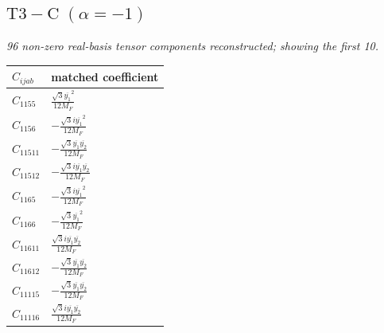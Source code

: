 \documentclass[9pt]{article}
\begin{document}
\subsection*{$ \mathrm{T3-C}\;(\alpha=-1) $}
\textit{96 non-zero real-basis tensor components reconstructed; showing the first 10.}
\begin{longtable}{@{}ll@{}}
\toprule
$C_{ijab}$ & matched coefficient \\
\midrule
$C_{1155}$ & $ \frac{\sqrt{3} \overline{y_{1}}^{2}}{12 M_F} $ \\
$C_{1156}$ & $ - \frac{\sqrt{3} i \overline{y_{1}}^{2}}{12 M_F} $ \\
$C_{11511}$ & $ - \frac{\sqrt{3} \overline{y_{1}} \overline{y_{2}}}{12 M_F} $ \\
$C_{11512}$ & $ - \frac{\sqrt{3} i \overline{y_{1}} \overline{y_{2}}}{12 M_F} $ \\
$C_{1165}$ & $ - \frac{\sqrt{3} i \overline{y_{1}}^{2}}{12 M_F} $ \\
$C_{1166}$ & $ - \frac{\sqrt{3} \overline{y_{1}}^{2}}{12 M_F} $ \\
$C_{11611}$ & $ \frac{\sqrt{3} i \overline{y_{1}} \overline{y_{2}}}{12 M_F} $ \\
$C_{11612}$ & $ - \frac{\sqrt{3} \overline{y_{1}} \overline{y_{2}}}{12 M_F} $ \\
$C_{11115}$ & $ - \frac{\sqrt{3} \overline{y_{1}} \overline{y_{2}}}{12 M_F} $ \\
$C_{11116}$ & $ \frac{\sqrt{3} i \overline{y_{1}} \overline{y_{2}}}{12 M_F} $ \\
\bottomrule
\end{longtable}
\end{document}

